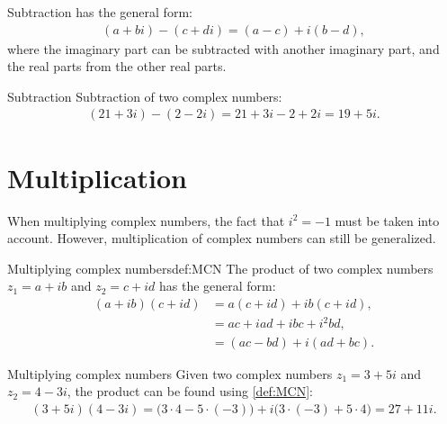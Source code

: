 \noindent 
Subtraction has the general form:
\begin{align*}
(a + bi) - (c + di) = (a - c) + i(b - d),
\end{align*}
where the imaginary part can be subtracted with another imaginary part, and the real parts from the other real parts.

\begin{example}{Subtraction}{}
Subtraction of two complex numbers:
\begin{align*}
(21 + 3i) - (2 - 2i) = 21 + 3i - 2 + 2i = 19 + 5i.
\end{align*}
\end{example}

\section{Multiplication}
When multiplying complex numbers, the fact that $i^2 =-1$ must be taken into account. However, multiplication of complex numbers can still be generalized. 
\begin{definition}{Multiplying complex numbers}{def:MCN}
The product of two complex numbers $z_1=a+ib$ and $z_2=c+id$ has the general form:
\begin{align*}
(a+ib)(c+id)&=a(c+id)+ib(c+id),
\\
&=ac+iad+ibc+i^2bd,
\\
&=(ac-bd)+i(ad+bc).
\end{align*}
\end{definition}
\begin{example}{Multiplying complex numbers}{}
Given two complex numbers $z_1=3+5i$ and $z_2=4-3i$, the product can be found using \cref{def:MCN}:
\begin{align*}
(3+5i)(4-3i) = \big(3\cdot4-5\cdot(-3)\big)+i\big(3\cdot(-3)+5\cdot4\big)=27+11i.
\end{align*}
\end{example}


